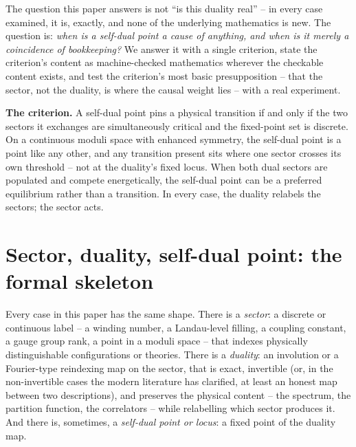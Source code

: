 \documentclass[11pt,a4paper]{article}
\begin{document}
The question this paper answers is not ``is this duality real'' -- in every case examined, it is,
exactly, and none of the underlying mathematics is new. The question is: \emph{when is a self-dual
point a cause of anything, and when is it merely a coincidence of bookkeeping?} We answer it with a
single criterion, state the criterion's content as machine-checked mathematics wherever the checkable
content exists, and test the criterion's most basic presupposition -- that the sector, not the
duality, is where the causal weight lies -- with a real experiment.

\begin{keybox}
\textbf{The criterion.} A self-dual point pins a physical transition if and only if the two sectors it
exchanges are simultaneously critical and the fixed-point set is discrete. On a continuous moduli
space with enhanced symmetry, the self-dual point is a point like any other, and any transition present
sits where one sector crosses its own threshold -- not at the duality's fixed locus. When both dual
sectors are populated and compete energetically, the self-dual point can be a preferred equilibrium
rather than a transition. In every case, the duality relabels the sectors; the sector acts.
\end{keybox}

\section{Sector, duality, self-dual point: the formal skeleton}

Every case in this paper has the same shape. There is a \emph{sector}: a discrete or continuous label
-- a winding number, a Landau-level filling, a coupling constant, a gauge group rank, a point in a
moduli space -- that indexes physically distinguishable configurations or theories. There is a
\emph{duality}: an involution or a Fourier-type reindexing map on the sector, that is exact,
invertible (or, in the non-invertible cases the modern literature has clarified, at least an honest
map between two descriptions), and preserves the physical content -- the spectrum, the partition
function, the correlators -- while relabelling which sector produces it. And there is, sometimes, a
\emph{self-dual point or locus}: a fixed point of the duality map.
\end{document}
